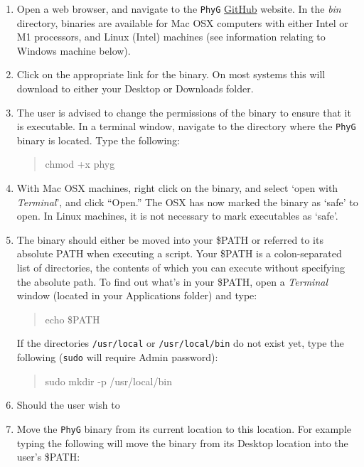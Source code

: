 \documentclass[11pt]{article}
\newcommand{\phyg}{\texttt{PhyG} }
\begin{document}
\begin{enumerate}
\item Open a web browser, and navigate to the \phyg \href{https://github.com/amnh/PhyGraph}
{GitHub} website. In the \emph{bin} directory, binaries are available for Mac OSX 
computers with either Intel or M1 processors, and Linux (Intel) machines (see information 
relating to Windows machine below).

\item Click on the appropriate link for the binary. On most systems this will 
download to either your Desktop or Downloads folder. 

\item The user is advised to change the permissions of the binary to ensure
that it is executable. In a terminal window, navigate to the directory where the \phyg
binary is located. Type the following:

	\begin{quote}
	chmod +x phyg
	\end{quote}

\item With Mac OSX machines, right click on the binary, and select `open with 
\emph{Terminal}', and click ``Open.'' The OSX has now marked the binary as `safe' 
to open. In Linux machines, it is not necessary to mark executables as `safe'.

\item The binary should either be moved into your \$PATH or referred to its 
absolute PATH when executing a script. Your \$PATH is a colon-separated list 
of directories, the contents of which you can execute without specifying the 
absolute path. To find out what's in your \$PATH, open a \textit{Terminal} window 
(located in your Applications folder) and type: 

	\begin{quote}
	echo \$PATH
	\end{quote}

If the directories \texttt{/usr/local} or \texttt{/usr/local/bin} do not exist yet, type the 
following (\texttt{sudo} will require Admin password): 

	\begin{quote}
	sudo mkdir -p /usr/local/bin
	\end{quote}

\item Should the user wish to 
\item Move the \phyg binary from its current location to this location. For example 
typing the following will move the binary from its Desktop location into the user's 
\$PATH:


\end{enumerate}
\end{document}
